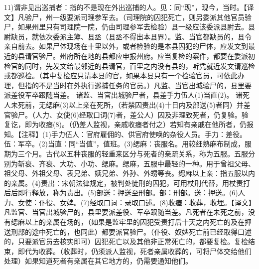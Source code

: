 \documentclass[12pt,UTF8]{ctexbook}
\begin{document}
11)谓非见出巡捕者：指的不是现在外出巡捕的人。见：同“现”，现今，当时。【译文】凡验尸，州一级要派司理参军去。（司理院的囚犯死亡，则另委派其他官员验尸，如果州里只有司理院一院，仍由司理参军去检验）县一级应该委派县尉去。县尉缺员，就依次委派主簿、县丞（县丞不得出本县界）。监、当官都缺员的，县令亲自前去。如果尸体现场在十里以外，或者检验的是本县囚犯的尸体，应发文到最近的县请官验尸。州府所在地的县都应申报州府。应当复检的案件，都要在委派初检官的同时，先发文给最邻近的县请官，百里之内没有县的，听凭就近发文请巡检或都巡检。（其中复检应只请本县的官，如果本县只有一个检验官员，可依此办理，但指的不是当时在外执行巡捕任务的官员。）凡监、当官出城验尸的，县里要派差役军卒跟随当差。
诸监、当官出城验尸者，县差手力伍人(1)当直(2)。
诸死人未死前，无缌麻(3)以上亲在死所，（若禁囚责出(4)十日内及部送(5)者同）并差官验尸。（人力、女使(6)经取口词(7)者，差公人）囚及非理致死者，仍复验。验复讫，即为收瘗(8)。（仍差人监视，亲戚收瘗者付之）若知有亲戚在他所者，仍报知。【注释】(1)手力伍人：官府雇佣的、供官府使唤的杂役人员。手力：差役。伍：军卒。(2)当直：同“当值”，值班。(3)缌麻：丧服名。用较细熟麻布制成，服期为三个月。古代以五种丧服的轻重来区分与死者的亲疏关系，称为五服。五服分别为斩衰、齐衰、大功、小功、缌麻。缌麻，五服中最轻的一种。用于曾祖父母、祖父母、外祖父母、表兄弟、姨兄弟、外孙、外甥等丧。缌麻以上亲：指五服以内的亲属。(4)责出：宋朝法律规定，被判处徒刑的囚犯，可用杖刑代替，用杖责打后后即行释放，称为责出。(5)部送：押送至刑部。部：刑部。送：押送。(6)人力、女使：仆役、女婢。(7)经取口词：录取口述。(8)收瘗：收葬，收埋。【译文】凡监官、当官出城验尸的，县里要派差役、军卒跟随当差。凡死者在未死之前，没有缌麻以上的亲属在场的，（如果是监牢里的囚犯受责打后十天之内死亡的及在押送刑部的途中死亡的，也同此）都要派官验尸。（仆役、奴婢死亡前已经取得口述的，只要派官员去核实即可）囚犯死亡以及其他非正常死亡的，都要复检。复检结束，即代为收葬。（收葬时，仍须派人监视，死者亲属收葬的，可将尸体交给他们处理）如果知道死者有亲属在其它地方的，仍需要通知他们。
\end{document}
